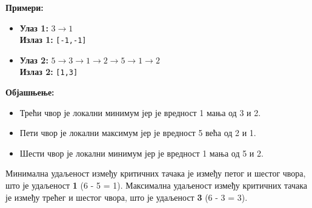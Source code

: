 \textbf{Примери:}
\begin{itemize}
    \item \textbf{Улаз 1:} $3 \rightarrow 1$ \\
          \textbf{Излаз 1:} \texttt{[-1,-1]}
    \item \textbf{Улаз 2:} $5 \rightarrow 3 \rightarrow 1 \rightarrow 2 \rightarrow 5 \rightarrow 1 \rightarrow 2$ \\
          \textbf{Излаз 2:} \texttt{[1,3]}
\end{itemize}

\textbf{Објашњење:}
\begin{itemize}
    \item Трећи чвор је локални минимум јер је вредност 1 мања од 3 и 2.
    \item Пети чвор је локални максимум јер је вредност 5 већа од 2 и 1.
    \item Шести чвор је локални минимум јер је вредност 1 мања од 5 и 2.
\end{itemize}

Минимална удаљеност између критичних тачака је између петог и шестог чвора, што је удаљеност \textbf{1} (6 - 5 = 1). Максимална удаљеност између критичних тачака је између трећег и шестог чвора, што је удаљеност \textbf{3} (6 - 3 = 3).

